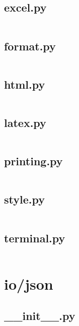 \documentclass{article}
\begin{document}
\subsection{excel.py}
\inputminted{python}{/home/dufferzafar/dev/@clones/pandas/pandas/io/formats/excel.py}
\newpage

\subsection{format.py}
\inputminted{python}{/home/dufferzafar/dev/@clones/pandas/pandas/io/formats/format.py}
\newpage

\subsection{html.py}
\inputminted{python}{/home/dufferzafar/dev/@clones/pandas/pandas/io/formats/html.py}
\newpage

\subsection{latex.py}
\inputminted{python}{/home/dufferzafar/dev/@clones/pandas/pandas/io/formats/latex.py}
\newpage

\subsection{printing.py}
\inputminted{python}{/home/dufferzafar/dev/@clones/pandas/pandas/io/formats/printing.py}
\newpage

\subsection{style.py}
\inputminted{python}{/home/dufferzafar/dev/@clones/pandas/pandas/io/formats/style.py}
\newpage

\subsection{terminal.py}
\inputminted{python}{/home/dufferzafar/dev/@clones/pandas/pandas/io/formats/terminal.py}
\newpage

\section{io/json}

\subsection{\_\_init\_\_.py}
\inputminted{python}{/home/dufferzafar/dev/@clones/pandas/pandas/io/json/__init__.py}
\newpage
\end{document}
